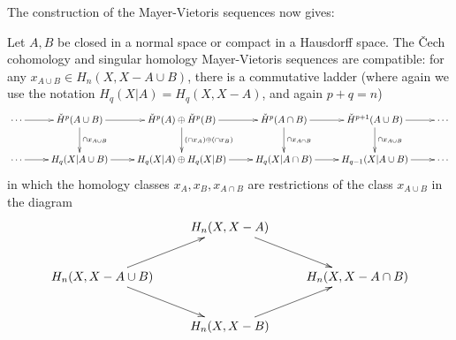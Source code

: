 The construction of the Mayer-Vietoris sequences now gives:
\begin{theorem}
\label{thm-mayer-vietoris-ladder}
Let $A, B$ be closed in a normal space or compact in a Hausdorff space. 
The \v{C}ech cohomology and singular homology Mayer-Vietoris sequences are 
compatible: for any $x_{A\cup B}\in H_n(X,X-A\cup B)$, 
there is a commutative ladder (where again we use the notation
$H_q(X|A)=H_q(X,X-A)$, and again $p+q=n$)
\begin{equation*}
\xymatrix{
\cdots \ar[r] & \cHH^p(A\cup B)\ar[r]\ar[d]^{\cap x_{A\cup B}} & 
\cHH^p(A)\oplus \cHH^p(B)\ar[r]\ar[d]^{(\cap x_A)\oplus(\cap x_B)} & 
\cHH^p(A\cap B)\ar[r]\ar[d]^{\cap x_{A\cap B}} & 
\cHH^{p+1}(A\cup B)\ar[r]\ar[d]^{\cap x_{A\cup B}} & \cdots\\
\cdots \ar[r] & H_q(X|A\cup B)\ar[r]& H_q(X|A)\oplus H_q(X|B)\ar[r]& H_q(X|A\cap B)\ar[r]& H_{q-1}(X|A\cup B)\ar[r]&\cdots
}
\end{equation*}
in which the  homology classes $x_A,x_B,x_{A\cap B}$  
are restrictions of the class $x_{A\cup B}$ in the diagram
\begin{equation*}
\xymatrix{
	 & H_n(X,X-A)\ar[dr] & \\
	H_n(X,X-A\cup B)\ar[ur]\ar[dr] & & H_n(X,X-A\cap B)\\
	 & H_n(X,X-B)\ar[ur]
}
\end{equation*}
\end{theorem}

